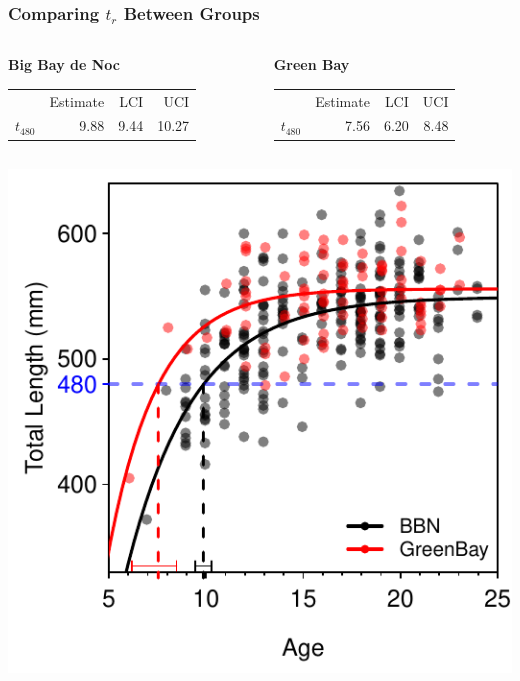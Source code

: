 \documentclass[xcolor=dvipsnames,t]{beamer}\usepackage[]{graphicx}\usepackage[]{color}
\newenvironment{knitrout}{}{} %
\begin{document}
\begin{frame}[fragile]
\frametitle{Comparing $t_{r}$ Between Groups}
\vspace{-6pt}
\begin{columns}
\begin{column}{0.5\textwidth}
\textbf{Big Bay de Noc}
\begin{table}[ht]
\centering
\begin{tabular}{rrrr}
  \hline
 & Estimate & LCI & UCI \\ 
  \rowcolor{light-gray} \hline
$t_{480}$ & 9.88 & 9.44 & 10.27 \\ 
   \hline
\end{tabular}
\end{table}

\end{column}
\begin{column}{0.5\textwidth}
\textbf{Green Bay}
\begin{table}[ht]
\centering
\begin{tabular}{rrrr}
  \hline
 & Estimate & LCI & UCI \\ 
  \rowcolor{light-gray} \hline
$t_{480}$ & 7.56 & 6.20 & 8.48 \\ 
   \hline
\end{tabular}
\end{table}

\end{column}
\end{columns}

\begin{knitrout}\footnotesize
{}\color{fgcolor}

{\centering \includegraphics[width=.45\linewidth]{Figs/unnamed-chunk-16-1} 

}



\end{knitrout}
\end{frame}
\end{document}
